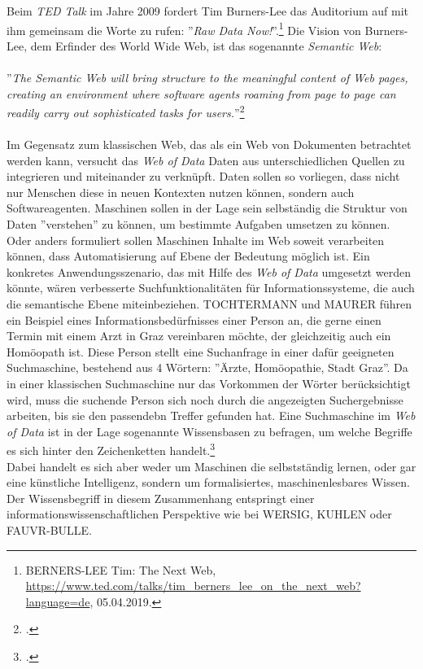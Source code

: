\documentclass[12pt,a4paper]{article}
\begin{document}
Beim \textit{TED Talk} im Jahre 2009 fordert Tim Burners-Lee das Auditorium auf mit ihm gemeinsam die Worte zu rufen: ''\textit{Raw Data Now!}''.\footnote{BERNERS-LEE Tim: The Next Web, \url{https://www.ted.com/talks/tim_berners_lee_on_the_next_web?language=de}, 05.04.2019.} Die Vision von Burners-Lee, dem Erfinder des World Wide Web, ist das sogenannte \textit{Semantic Web}:
\\
\\
''\textit{The Semantic Web will bring structure to the meaningful content of Web pages, creating an environment where software agents roaming from page to page can readily carry out sophisticated tasks for users.}''\footcite[][S.3]{berners2001semantic}
\\
\\
Im Gegensatz zum klassischen Web, das als ein Web von Dokumenten betrachtet werden kann, versucht das \textit{Web of Data} Daten aus unterschiedlichen Quellen zu integrieren und miteinander zu verknüpft. Daten sollen so vorliegen, dass nicht nur Menschen diese in neuen Kontexten nutzen können, sondern auch Softwareagenten. Maschinen sollen in der Lage sein selbständig die Struktur von Daten ''verstehen'' zu können, um bestimmte Aufgaben umsetzen zu können. Oder anders formuliert sollen Maschinen Inhalte im Web soweit verarbeiten können, dass Automatisierung auf Ebene der Bedeutung möglich ist. Ein konkretes Anwendungsszenario, das mit Hilfe des \textit{Web of Data} umgesetzt werden könnte, wären verbesserte Suchfunktionalitäten für Informationssysteme, die auch die semantische Ebene miteinbeziehen. TOCHTERMANN und MAURER führen ein Beispiel eines Informationsbedürfnisses einer Person an, die gerne einen Termin mit einem Arzt in Graz vereinbaren möchte, der gleichzeitig auch ein Homöopath ist. Diese Person stellt eine Suchanfrage in einer dafür geeigneten Suchmaschine, bestehend aus 4 Wörtern: ''Ärzte, Homöopathie, Stadt Graz''. Da in einer klassischen Suchmaschine nur das Vorkommen der Wörter berücksichtigt wird, muss die suchende Person sich noch durch die angezeigten Suchergebnisse arbeiten, bis sie den passendebn Treffer gefunden hat. Eine Suchmaschine im \textit{Web of Data} ist in der Lage sogenannte Wissensbasen zu befragen, um welche Begriffe es sich hinter den Zeichenketten handelt.\footcite[S.1-2]{pellegrini2006semantic} 
\\
 Dabei handelt es sich aber weder um Maschinen die selbstständig lernen, oder gar eine künstliche Intelligenz, sondern um formalisiertes, maschinenlesbares Wissen. Der Wissensbegriff in diesem Zusammenhang entspringt einer informationswissenschaftlichen Perspektive wie bei WERSIG, KUHLEN oder FAUVR-BULLE.
\end{document}
